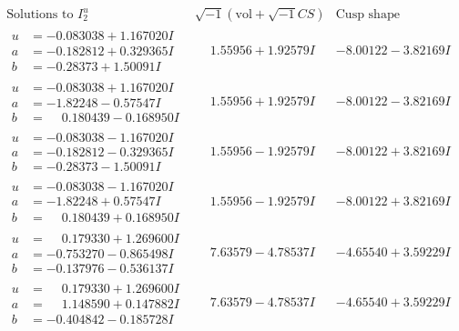 \documentclass[1p]{elsarticle_modified}
\theoremstyle{definition}
\newcommand{\I}{\sqrt{-1}}
\begin{document}
$$\begin{array}{c|c|c}  
\text{Solutions to }I^u_{2}& \I (\text{vol} + \sqrt{-1}CS) & \text{Cusp shape}\\
 \hline 
\begin{aligned}
u &= -0.083038 + 1.167020 I \\
a &= -0.182812 + 0.329365 I \\
b &= -0.28373 + 1.50091 I\end{aligned}
 & \phantom{-}1.55956 + 1.92579 I & -8.00122 - 3.82169 I \\ \hline\begin{aligned}
u &= -0.083038 + 1.167020 I \\
a &= -1.82248 - 0.57547 I \\
b &= \phantom{-}0.180439 - 0.168950 I\end{aligned}
 & \phantom{-}1.55956 + 1.92579 I & -8.00122 - 3.82169 I \\ \hline\begin{aligned}
u &= -0.083038 - 1.167020 I \\
a &= -0.182812 - 0.329365 I \\
b &= -0.28373 - 1.50091 I\end{aligned}
 & \phantom{-}1.55956 - 1.92579 I & -8.00122 + 3.82169 I \\ \hline\begin{aligned}
u &= -0.083038 - 1.167020 I \\
a &= -1.82248 + 0.57547 I \\
b &= \phantom{-}0.180439 + 0.168950 I\end{aligned}
 & \phantom{-}1.55956 - 1.92579 I & -8.00122 + 3.82169 I \\ \hline\begin{aligned}
u &= \phantom{-}0.179330 + 1.269600 I \\
a &= -0.753270 - 0.865498 I \\
b &= -0.137976 - 0.536137 I\end{aligned}
 & \phantom{-}7.63579 - 4.78537 I & -4.65540 + 3.59229 I \\ \hline\begin{aligned}
u &= \phantom{-}0.179330 + 1.269600 I \\
a &= \phantom{-}1.148590 + 0.147882 I \\
b &= -0.404842 - 0.185728 I\end{aligned}
 & \phantom{-}7.63579 - 4.78537 I & -4.65540 + 3.59229 I \\ \hline\begin{aligned}

\end{aligned}
\end{array}$$
\end{document}
